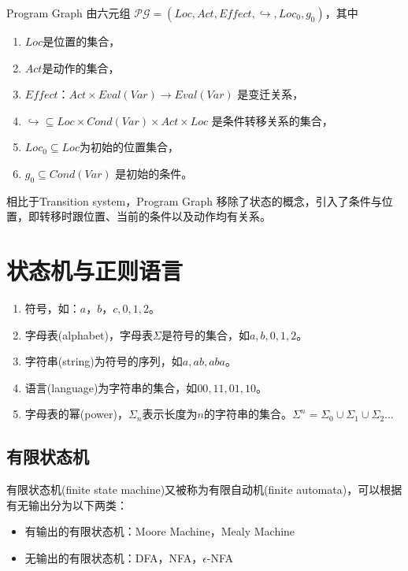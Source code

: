 \begin{definition}
Program Graph 由六元组 $\mathcal{PG}=\left(Loc,Act,Effect,\hookrightarrow,Loc_{0},g_{0}\right)$，其中
\begin{enumerate}
    \item $Loc$是位置的集合，
    \item $Act$是动作的集合，
    \item $Effect \text{：}Act \times Eval(Var) \rightarrow Eval(Var)$ 是变迁关系，
    \item $\hookrightarrow \subseteq Loc \times Cond(Var) \times Act \times Loc$ 是条件转移关系的集合，
    \item $Loc_{0} \subseteq Loc$为初始的位置集合，
    \item $g_{0} \subseteq Cond(Var)$ 是初始的条件。
\end{enumerate}
相比于Transition system，Program Graph 移除了状态的概念，引入了条件与位置，即转移时跟位置、当前的条件以及动作均有关系。
\end{definition}

\section{状态机与正则语言}
\begin{definition}[前置知识]
\begin{enumerate}
    \item 符号，如：$a，b，c, 0, 1, 2$。
    \item 字母表(alphabet)，字母表$\Sigma$是符号的集合，如${a,b}, {0,1,2}$。
    \item 字符串(string)为符号的序列，如$a,ab,aba$。
    \item 语言(language)为字符串的集合，如${00,11,01,10}$。
    \item 字母表的幂(power)，$\Sigma_{n}$表示长度为$n$的字符串的集合。$\Sigma^{n}=\Sigma_{0}
    \cup \Sigma_{1} \cup \Sigma_{2}\dots$
\end{enumerate}
\end{definition}

\subsection{有限状态机}
有限状态机(finite state machine)又被称为有限自动机(finite automata)，可以根据有无输出分为以下两类：
\begin{itemize}
    \item 有输出的有限状态机：Moore Machine，Mealy Machine
    \item 无输出的有限状态机：DFA，NFA，$\epsilon$-NFA
\end{itemize}

